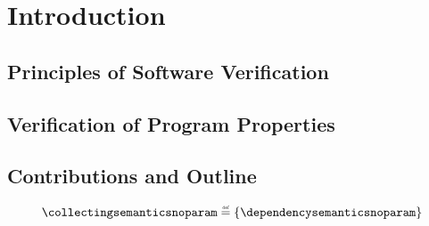 \chapter{Introduction}

\section{Principles of Software Verification}

\section{Verification of Program Properties}

\section{Contributions and Outline}


\begin{definition}
  \begin{align}
    \labeq{collecting-semantics}
    \collectingsemanticsnoparam \defeq \{ \dependencysemanticsnoparam \}
  \end{align}
\end{definition}
